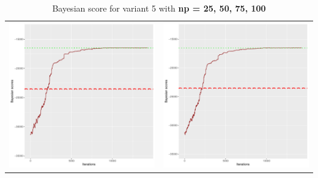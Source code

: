 \documentclass[]{scrartcl}
\begin{document}
\begin{table}[h!]
\begin{tabular}{cc}
\includegraphics[scale = 0.4]{./figs/win95pts/v5/75/bayBoundsEvolution-14252.pdf} & 
\includegraphics[scale = 0.4]{./figs/win95pts/v5/100/bayBoundsEvolution-14252.pdf} \\
\end{tabular}
\caption{Bayesian score for variant 5 with \textbf{np =  25, 50, 75, 100}}
\end{table}
\end{document}
